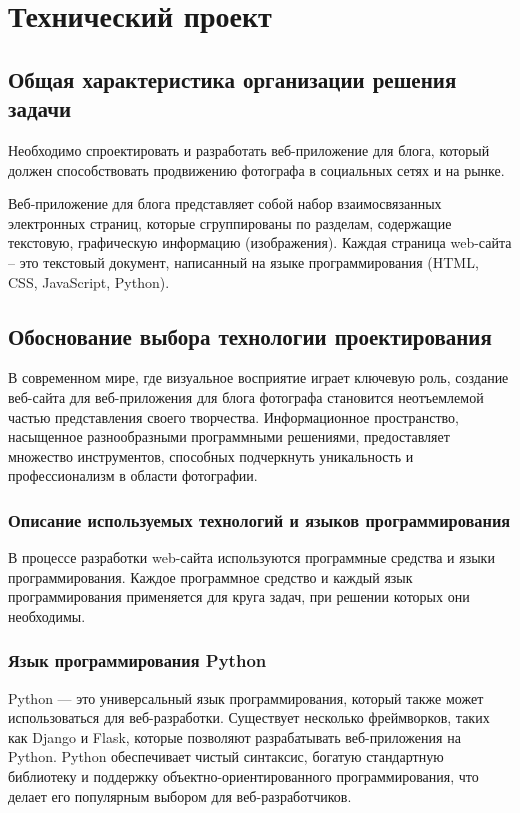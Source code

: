 \section{Технический проект}
\subsection{Общая характеристика организации решения задачи}

Необходимо спроектировать и разработать веб-приложение для блога, который должен способствовать продвижению фотографа в социальных сетях и на рынке.

Веб-приложение для блога представляет собой набор взаимосвязанных электронных страниц, которые сгруппированы по разделам, содержащие текстовую, графическую информацию (изображения). Каждая страница web-сайта – это текстовый документ, написанный на языке программирования (HTML, CSS, JavaScript, Python).

\subsection{Обоснование выбора технологии проектирования}

В современном мире, где визуальное восприятие играет ключевую роль, создание веб-сайта для веб-приложения для блога фотографа становится неотъемлемой частью представления своего творчества. Информационное пространство, насыщенное разнообразными программными решениями, предоставляет множество инструментов, способных подчеркнуть уникальность и профессионализм в области фотографии.

\subsubsection{Описание используемых технологий и языков программирования}

В процессе разработки web-сайта используются программные средства и языки программирования. Каждое программное средство и каждый язык программирования применяется для круга задач, при решении которых они необходимы.

\subsubsection{Язык программирования Python}

Python — это универсальный язык программирования, который также может использоваться для веб-разработки. Существует несколько фреймворков, таких как Django и Flask, которые позволяют разрабатывать веб-приложения на Python. Python обеспечивает чистый синтаксис, богатую стандартную библиотеку и поддержку объектно-ориентированного программирования, что делает его популярным выбором для веб-разработчиков.


